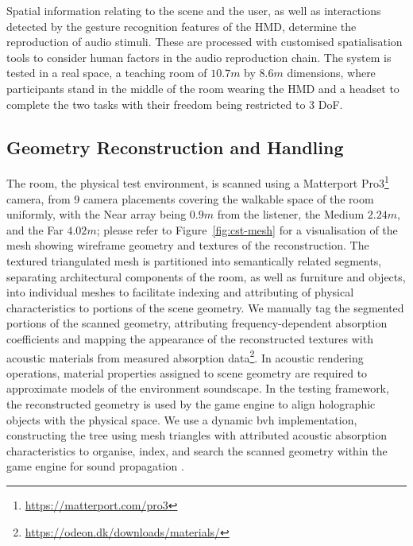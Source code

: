 Spatial information relating to the scene and the user, as well as interactions detected by the gesture recognition features of the HMD, determine the reproduction of audio stimuli. These are processed with customised spatialisation tools to consider human factors in the audio reproduction chain. The system is tested in a real space, a teaching room of $10.7m$ by $8.6m$ dimensions, where participants stand in the middle of the room wearing the HMD and a headset to complete the two tasks with their freedom being restricted to 3 DoF.\par

\subsection{Geometry Reconstruction and Handling}
The room, the physical test environment, is scanned using a Matterport Pro3\footnote{\url{https://matterport.com/pro3}} camera, from 9 camera placements covering the walkable space of the room uniformly, with the Near array being $0.9m$ from the listener, the Medium $2.24m$, and the Far $4.02m$; please refer to Figure~\ref{fig:cst-mesh} for a visualisation of the mesh showing wireframe geometry and textures of the reconstruction. The textured triangulated mesh is partitioned into semantically related segments, separating architectural components of the room, as well as furniture and objects, into individual meshes to facilitate indexing and attributing of physical characteristics to portions of the scene geometry. We manually tag the segmented portions of the scanned geometry, attributing frequency-dependent absorption coefficients and mapping the appearance of the reconstructed textures with acoustic materials from measured absorption data\footnote{\url{https://odeon.dk/downloads/materials/}}. In acoustic rendering operations, material properties assigned to scene geometry are required to approximate models of the environment soundscape. 
In the testing framework, the reconstructed geometry is used by the game engine to align holographic objects with the physical space. We use a dynamic \acrshort{bvh} implementation, constructing the tree using mesh triangles with attributed acoustic absorption characteristics to organise, index, and search the scanned geometry within the game engine for sound propagation \citep{kopta2012fast}.\par

